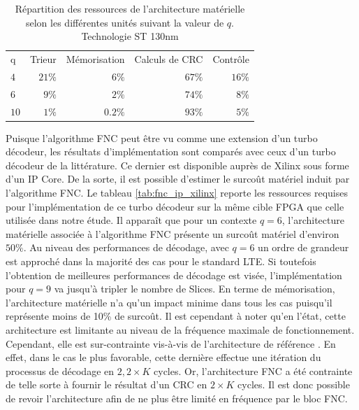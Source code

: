 \begin{table}[!ht]
	\centering
	\caption{Répartition des ressources de l'architecture matérielle selon les différentes unités suivant la 
	valeur de $q$. Technologie ST 130nm}
	\label{tab:fnc_arch_per}
	\begin{tabular}{lrrrr} 
		\toprule
		 q        & Trieur  & Mémorisation  & Calculs de CRC & Contrôle  \\ 	\cmidrule(r){1-1}\cmidrule(l){2-5}
		$4$    & $21\%$ & $6\%$  & $67\%$ & $16\%$  \\ 
		$6$    & $9\%$  & $2\%$  & $74\%$ & $8\%$ \\ 
		$10$   & $1\%$ & $0.2\%$ & $93\%$ & $5\%$ \\ 
		\bottomrule 
	\end{tabular}
\end{table}

Puisque l'algorithme FNC peut être vu comme une extension d'un turbo décodeur, les résultats d'implémentation sont 
comparés avec ceux d'un turbo décodeur de la littérature. Ce dernier est disponible auprès de Xilinx sous forme d'un IP Core. 
De la sorte, il est possible d'estimer
le surcoût matériel induit par l'algorithme FNC. Le tableau \ref{tab:fnc_ip_xilinx} reporte les ressources requises
pour l'implémentation de ce turbo décodeur \cite{xilinxUMTS} sur la même cible FPGA que celle utilisée dans notre étude. 
Il apparaît que pour un contexte $q=6$, l'architecture matérielle associée à l'algorithme FNC présente un surcoût 
matériel d'environ $50\%$. Au niveau des performances de décodage, avec $q=6$ un ordre de grandeur est approché dans la 
majorité des cas pour le standard LTE. Si toutefois l'obtention de meilleures performances de décodage est visée,
l'implémentation pour $q=9$ va jusqu'à tripler le nombre de Slices. En terme de mémorisation, l'architecture matérielle 
n'a qu'un impact minime dans tous les cas puisqu'il représente moins de 10\% de surcoût. Il est 
cependant à noter qu'en l'état, cette architecture est limitante au niveau de la fréquence maximale de fonctionnement. 
Cependant, elle est sur-contrainte vis-à-vis de l'architecture de référence \cite{xilinxUMTS}. En effet, dans le cas le plus 
favorable, cette dernière effectue une itération du processus de décodage en $2,2\times K$ cycles. Or, l'architecture FNC
a été contrainte de telle sorte à fournir le résultat d'un CRC en $2\times K$ cycles. Il est donc possible de revoir l'architecture 
afin de ne plus être limité en fréquence par le bloc FNC.

